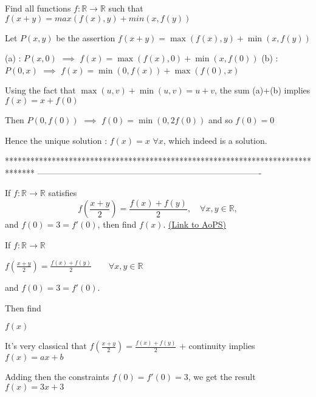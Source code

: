 \begin{solution}
	\begin{tcolorbox}Find all functions $f: \mathbb{R}\to\mathbb{R}$ such that $f(x+y)=max(f(x),y)+min(x,f(y))$\end{tcolorbox}
Let $P(x,y)$ be the assertion $f(x+y)=\max(f(x),y)+\min(x,f(y))$

(a) : $P(x,0)$ $\implies$ $f(x)=\max(f(x),0)+\min(x,f(0))$
(b) : $P(0,x)$ $\implies$ $f(x)=\min(0,f(x))+\max(f(0),x)$

Using the fact that $\max(u,v)+\min(u,v)=u+v$, the sum (a)+(b) implies  $f(x)=x+f(0)$ 

Then $P(0,f(0))$ $\implies$ $f(0)=\min(0,2f(0))$ and so $f(0)=0$

Hence the unique solution : $\boxed{f(x)=x}$ $\forall x$, which indeed is a solution.
\end{solution}
*******************************************************************************
-------------------------------------------------------------------------------

\begin{problem}
	If $f : \mathbb{R} \to \mathbb{R}$ satisfies
\[f \left( \frac{x+y}{2} \right) = \frac{f(x)+f(y)}{2}, \quad \forall x,y \in \mathbb{R},\]
and $f(0)=3=f'(0)$, then find $f(x)$.
	\flushright \href{https://artofproblemsolving.com/community/c6h406831}{(Link to AoPS)}
\end{problem}



\begin{solution}
	\begin{tcolorbox}If $f : \mathbb{R} \to \mathbb{R}$
 
$f \left( \frac{x+y}{2} \right) = \frac{f(x)+f(y)}{2} \qquad \forall x,y \in \mathbb{R}$

and $f(0)=3=f'(0)$. \begin{bolded}Then find\end{bolded} $f(x)$\end{tcolorbox}
It's very classical that $f(\frac{x+y}2)=\frac{f(x)+f(y)}2$ + continuity implies $f(x)=ax+b$

Adding then the constraints $f(0)=f'(0)=3$, we get the result $\boxed{f(x)=3x+3}$
\end{solution}



